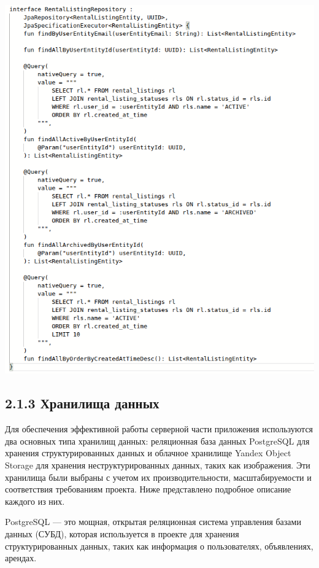 \documentclass[14pt]{extarticle}
\begin{document}
\begin{center}
    \includegraphics[width=1.0\textwidth]{repository.png}
\end{center}

\newpage

\subsection{2.1.3 Хранилища данных}

\bigskip

Для обеспечения эффективной работы серверной части приложения используются
два основных типа хранилищ данных: реляционная база данных
PostgreSQL для хранения структурированных данных
и облачное хранилище Yandex Object Storage
для хранения неструктурированных данных, таких как изображения.
Эти хранилища были выбраны с учетом их производительности,
масштабируемости и соответствия требованиям проекта.
Ниже представлено подробное описание каждого из них.

PostgreSQL --- это мощная, открытая реляционная система управления
базами данных (СУБД), которая используется в проекте для хранения
структурированных данных, таких как информация о пользователях,
объявлениях, арендах.
\end{document}
